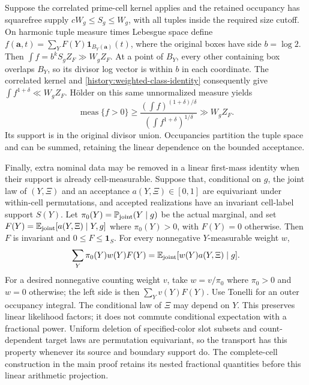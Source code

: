 Suppose the correlated prime-cell kernel applies and the retained
occupancy has squarefree supply $cW_g\le S_g\le W_g$, with all tuples
inside the required size cutoff. On harmonic tuple measure times
Lebesgue space define
$f(\mathbf a,t)=\sum_YF(Y)\mathbf1_{B_Y(\mathbf a)}(t)$,
where the original boxes have side $b=\log2$. Then
$\int f=b^kS_gZ_F\gg W_gZ_F$.
At a point of $B_Y$, every other containing box overlaps $B_Y$, so
its divisor log vector is within $b$ in each coordinate. The correlated
kernel and \eqref{history:weighted-class-identity} consequently give
$\int f^{1+\delta}\ll W_gZ_F$. H\"older on this same unnormalized
measure yields
\[
 \operatorname{meas}\{f>0\}
 \ge\frac{(\int f)^{(1+\delta)/\delta}}
          {(\int f^{1+\delta})^{1/\delta}}
 \gg W_gZ_F.
\]
Its support is in the original divisor union. Occupancies partition
the tuple space and can be summed, retaining the linear dependence
on the bounded acceptance.

Finally, extra nominal data may be removed in a linear first-mass
identity when their support is already cell-measurable. Suppose that,
conditional on $g$, the joint law of $(Y,\Xi)$ and an acceptance
$a(Y,\Xi)\in[0,1]$ are equivariant under within-cell permutations,
and accepted realizations have an invariant cell-label support $S(Y)$.
Let $\pi_0(Y)=\mathbb P_{\rm joint}(Y\mid g)$ be the actual marginal,
and set $F(Y)=\mathbb E_{\rm joint}[a(Y,\Xi)\mid Y,g]$ where
$\pi_0(Y)>0$, with $F(Y)=0$ otherwise. Then $F$ is invariant and
$0\le F\le\mathbf1_S$. For every nonnegative $Y$-measurable weight $w$,
\[
 \sum_Y\pi_0(Y)w(Y)F(Y)
       =\mathbb E_{\rm joint}[w(Y)a(Y,\Xi)\mid g].
\]
For a desired nonnegative counting weight $v$, take $w=v/\pi_0$
where $\pi_0>0$ and $w=0$ otherwise; the left side is then
$\sum_Yv(Y)F(Y)$. Use Tonelli for an outer occupancy integral.
The conditional law of $\Xi$ may depend
on $Y$. This preserves linear likelihood factors; it does not commute
conditional expectation with a fractional power. Uniform deletion of
specified-color slot subsets and count-dependent target laws are
permutation equivariant, so the transport has this property whenever
its source and boundary support do. The complete-cell construction in
the main proof retains its nested fractional quantities before this
linear arithmetic projection.
